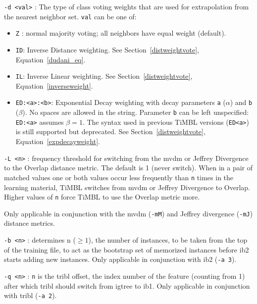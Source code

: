 \documentclass{report}
\begin{document}
\begin{description}
\item {\tt -d <val>} : The type of class voting weights that are used for
extrapolation from the nearest neighbor set. {\tt val} can be one of:
	\begin{itemize} 

  	\item {\tt Z} : normal majority voting; all neighbors have
         equal weight (default).

  	\item {\tt ID}: Inverse Distance weighting. See
  	Section~\ref{distweightvote}, Equation~\ref{dudani_eq}.

  	\item {\tt IL}: Inverse Linear weighting. See
  	Section~\ref{distweightvote}, Equation~\ref{inverseweight}.

  	\item {\tt ED:<a>:<b>}: Exponential Decay weighting with decay
  	parameters {\tt a} ($\alpha$) and {\tt b} ($\beta$). No spaces
  	are allowed in the string. Parameter {\tt b} can be left
  	unspecified: {\tt ED:<a>} assumes $\beta=1$. The syntax used
  	in previous TiMBL versions ({\tt ED<a>}) is still supported
  	but deprecated. See Section~\ref{distweightvote},
  	Equation~\ref{expdecayweight}.

\end{itemize}

\item {\tt -L <n>} : frequency threshold for switching from the {\sc
    mvdm} or Jeffrey Divergence to the Overlap distance metric. The
  default is 1 (never switch). When in a pair of matched values one or
  both values occur less frequently than {\tt n} times in the learning
  material, TiMBL switches from {\sc mvdm} or Jeffrey Divergence to
  Overlap. Higher values of {\tt n} force TiMBL to use the Overlap
  metric more. 

 Only applicable in conjunction with the {\sc mvdm}
  ({\tt -mM}) and Jeffrey divergence ({\tt -mJ}) distance metrics.


\item {\tt -b <n>} : determines n ($\geq 1$), the number of instances,
to be taken from the top of the training file, to act as the bootstrap
set of memorized instances before {\sc ib2} starts adding new
instances. Only applicable in conjunction with {\sc ib2} ({\tt -a 3}).

\item {\tt -q <n>} : {\tt n} is the {\sc tribl} offset, the index
number of the feature (counting from 1) after which {\sc tribl} should
switch from {\sc igtree} to {\sc ib1}. Only applicable in conjunction
with {\sc tribl} ({\tt -a 2}).


\end{description}
\end{document}
